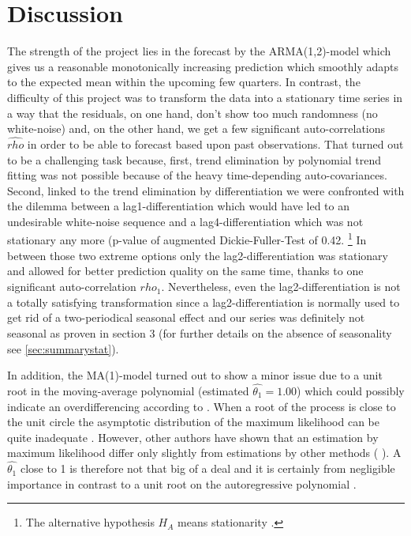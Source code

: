 \documentclass[11pt,a4paper]{article}
\begin{document}
\section{Discussion}
The strength of the project lies in the forecast by the ARMA(1,2)-model which gives us a reasonable monotonically increasing prediction which smoothly adapts to the expected mean within the upcoming few quarters.
In contrast, the difficulty of this project was to transform the data into a stationary time series in a way that the residuals, on one hand, don't show too much randomness (no white-noise) and, on the other hand, we get a few significant auto-correlations $\hat{rho}$ in order to be able to forecast based upon past observations.
That turned out to be a challenging task because, first, trend elimination by polynomial trend fitting was not possible because of the heavy time-depending auto-covariances.
Second, linked to the trend elimination by differentiation we were confronted with the dilemma between a lag1-differentiation which would have led to an undesirable white-noise sequence and a lag4-differentiation which was not stationary any more (p-value of augmented Dickie-Fuller-Test of 0.42.
\footnote{
    The alternative hypothesis $H_A$ means stationarity \citep{adf}.
}
In between those two extreme options only the lag2-differentiation was stationary and allowed for better prediction quality on the same time, thanks to one significant auto-correlation $\hat{rho_1}$.
Nevertheless, even the lag2-differentiation is not a totally satisfying transformation since a lag2-differentiation is normally used to get rid of a two-periodical seasonal effect and our series was definitely not seasonal as proven in section 3 (for further details on the absence of seasonality see \cref{sec:summarystat}).
 
In addition, the MA(1)-model turned out to show a minor issue due to a unit root in the moving-average polynomial (estimated $\hat{\theta_1} = 1.00$) which could possibly indicate an overdifferencing according to \cite[~p.194]{bd02}.
When a root of the process is close to the unit circle the asymptotic distribution of the maximum likelihood can be quite inadequate \citep{davidson81}.
However, other authors have shown that an estimation by maximum likelihood differ only slightly from estimations by other methods (\citep{davisdunsmuir96} ).
A $\hat{\theta_1}$ close to 1 is therefore not that big of a deal and it is certainly from negligible importance in contrast to a unit root on the autoregressive polynomial \citep{plosser77}.
\end{document}
